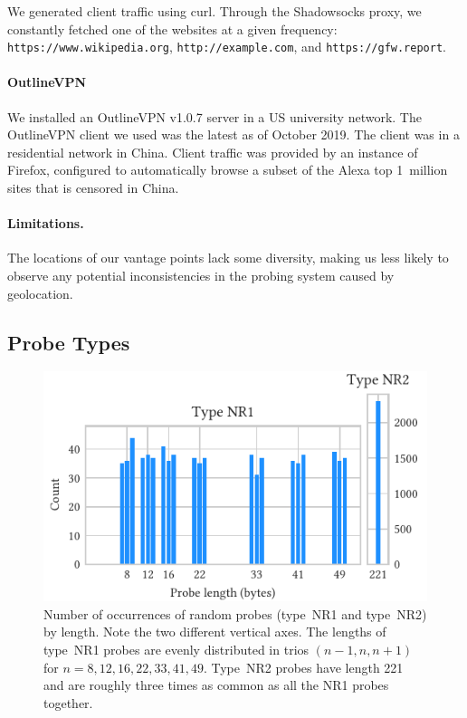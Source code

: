 \documentclass[sigconf,letterpaper]{acmart}
\begin{document}
We generated client traffic using curl.
Through the Shadowsocks proxy, we constantly fetched one of the websites at a given frequency:
\nolinkurl{https://www.wikipedia.org},
\nolinkurl{http://example.com},
and \nolinkurl{https://gfw.report}.

\paragraph{OutlineVPN}
We installed an OutlineVPN v1.0.7 server in a US university network.
The OutlineVPN client we used was the latest as of October 2019.
The client was in a residential network in China.
Client traffic was provided by an instance of Firefox,
configured to automatically browse a subset of the Alexa top 1~million sites that is censored in China.

\paragraph{Limitations.}
The locations of our vantage points lack some diversity,
making us less likely to observe any potential inconsistencies in the probing system
caused by geolocation.

\subsection{Probe Types}
\label{sec:probe-types}

\begin{figure}
    \includegraphics{figures/random-probe-length-distribution}
    \caption{
    Number of occurrences of random probes (type~NR1 and type~NR2) by length.
    Note the two different vertical axes.
    The lengths of type~NR1 probes are evenly distributed in trios
    $(n-1, n, n+1)$ for $n = 8, 12, 16, 22, 33, 41, 49$.
    Type~NR2 probes have length 221 and are roughly three times as common
    as all the NR1 probes together.
    }
    \label{fig:random-probe-length-distribution}
\end{figure}
\end{document}
